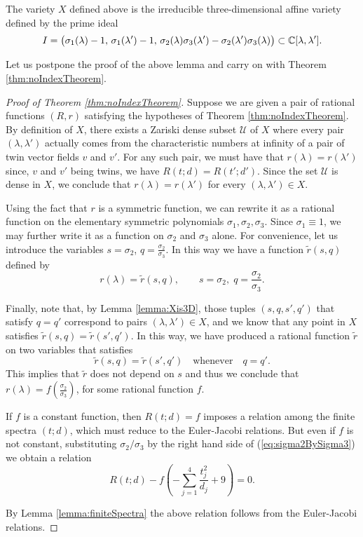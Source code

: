 \documentclass[phd,tocprelim]{cornell}
\begin{document}
\begin{lemma}\label{lemma:Xis3D}
 The variety $X$ defined above is the irreducible three-dimensional affine variety defined by the prime ideal
  \[ I = \big( \sigma_1(\lambda)-1,\, \sigma_1(\lambda')-1,\,  \sigma_2(\lambda)\sigma_3(\lambda')-\sigma_2(\lambda')\sigma_3(\lambda) \big) \subset \mathbb{C}[\lambda,\lambda']. \]
\end{lemma}

Let us postpone the proof of the above lemma and carry on with Theorem \ref{thm:noIndexTheorem}.

\begin{proof}[Proof of Theorem \ref*{thm:noIndexTheorem}]
Suppose we are given a pair of rational functions $(R,r)$ satisfying the hypotheses of Theorem \ref{thm:noIndexTheorem}. By definition of $X$, there exists a Zariski dense subset $\mathcal{U}$ of $X$ where every pair $(\lambda,\lambda')$ actually comes from the characteristic numbers at infinity of a pair of twin vector fields $v$ and $v'$. For any such pair, we must have that $r(\lambda)=r(\lambda')$ since, $v$ and $v'$ being twins, we have $R(t;d)=R(t';d')$. Since the set $\mathcal{U}$ is dense in $X$, we conclude that $r(\lambda)=r(\lambda')$ for every $(\lambda,\lambda')\in X$.

Using the fact that $r$ is a symmetric function, we can rewrite it as a rational function on the elementary symmetric polynomials $\sigma_1,\sigma_2,\sigma_3$. Since $\sigma_1\equiv 1$, we may further write it as a function on $\sigma_2$ and $\sigma_3$ alone. For convenience, let us introduce the variables $s=\sigma_2$, $q=\frac{\sigma_2}{\sigma_3}$. In this way we have a function $\tilde{r}(s,q)$ defined by
 \[ r(\lambda)=\tilde{r}(s,q), \qquad s=\sigma_2,\; q=\frac{\sigma_2}{\sigma_3}. \]

Finally, note that, by Lemma \ref{lemma:Xis3D}, those tuples $(s,q,s',q')$ that satisfy $q=q'$ correspond to pairs $(\lambda,\lambda')\in X$, and we know that any point in $X$ satisfies $\tilde{r}(s,q)=\tilde{r}(s',q')$. In this way, we have produced a rational function $\tilde{r}$ on two variables that satisfies 
 \[ \tilde{r}(s,q)=\tilde{r}(s',q') \quad \text{whenever} \quad q=q'. \]
This implies that $\tilde{r}$ does not depend on $s$ and thus we conclude that $r(\lambda)=f(\frac{\sigma_2}{\sigma_3})$, for some rational function $f$.

If $f$ is a constant function, then $R(t;d)=f$ imposes a relation among the finite spectra $(t;d)$, which must reduce to the Euler-Jacobi relations. But even if $f$ is not constant, substituting $\sigma_2/\sigma_3$ by the right hand side of (\ref{eq:sigma2BySigma3}) we obtain a relation
 \[ R(t;d) - f \left(-\sum_{j=1}^4\frac{t_j^2}{d_j} +9 \right) = 0. \]
 
By Lemma \ref{lemma:finiteSpectra} the above relation follows from the Euler-Jacobi relations.
\end{proof}
\end{document}
